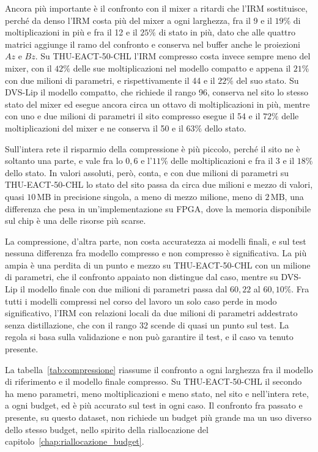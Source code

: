Ancora più importante è il confronto con il mixer a ritardi che l'IRM sostituisce, perché da denso l'IRM costa più del mixer a ogni larghezza, fra il 9 e il $19\%$ di moltiplicazioni in più e fra il 12 e il $25\%$ di stato in più, dato che alle quattro matrici aggiunge il ramo del confronto e conserva nel buffer anche le proiezioni $Az$ e $Bz$. Su THU-EACT-50-CHL l'IRM compresso costa invece sempre meno del mixer, con il $42\%$ delle sue moltiplicazioni nel modello compatto e appena il $21\%$ con due milioni di parametri, e rispettivamente il 44 e il $22\%$ del suo stato. Su DVS-Lip il modello compatto, che richiede il rango 96, conserva nel sito lo stesso stato del mixer ed esegue ancora circa un ottavo di moltiplicazioni in più, mentre con uno e due milioni di parametri il sito compresso esegue il 54 e il $72\%$ delle moltiplicazioni del mixer e ne conserva il 50 e il $63\%$ dello stato.

Sull'intera rete il risparmio della compressione è più piccolo, perché il sito ne è soltanto una parte, e vale fra lo $0{,}6$ e l'$11\%$ delle moltiplicazioni e fra il 3 e il $18\%$ dello stato. In valori assoluti, però, conta, e con due milioni di parametri su THU-EACT-50-CHL lo stato del sito passa da circa due milioni e mezzo di valori, quasi $10\,\mathrm{MB}$ in precisione singola, a meno di mezzo milione, meno di $2\,\mathrm{MB}$, una differenza che pesa in un'implementazione su FPGA, dove la memoria disponibile sul chip è una delle risorse più scarse.

La compressione, d'altra parte, non costa accuratezza ai modelli finali, e sul test nessuna differenza fra modello compresso e non compresso è significativa. La più ampia è una perdita di un punto e mezzo su THU-EACT-50-CHL con un milione di parametri, che il confronto appaiato non distingue dal caso, mentre su DVS-Lip il modello finale con due milioni di parametri passa dal $60{,}22$ al $60{,}10\%$. Fra tutti i modelli compressi nel corso del lavoro un solo caso perde in modo significativo, l'IRM con relazioni locali da due milioni di parametri addestrato senza distillazione, che con il rango 32 scende di quasi un punto sul test. La regola si basa sulla validazione e non può garantire il test, e il caso va tenuto presente.

La tabella~\ref{tab:compressione} riassume il confronto a ogni larghezza fra il modello di riferimento e il modello finale compresso. Su THU-EACT-50-CHL il secondo ha meno parametri, meno moltiplicazioni e meno stato, nel sito e nell'intera rete, a ogni budget, ed è più accurato sul test in ogni caso. Il confronto fra passato e presente, su questo dataset, non richiede un budget più grande ma un uso diverso dello stesso budget, nello spirito della riallocazione del capitolo~\ref{chap:riallocazione_budget}.

